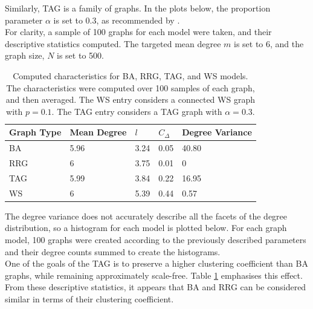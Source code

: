 Similarly, TAG is a family of graphs. In the plots below, the proportion parameter $\alpha$ is set to 0.3, as recommended by \cite{RN49}.\\

For clarity, a sample of 100 graphs for each model were taken, and their descriptive statistics computed. The targeted mean degree $m$ is set to 6, and the graph size, $N$ is set to 500. \\


\FloatBarrier

    

\begin{table}[!h]
\begin{center}
\begin{tabular}{|l|l|l|l|l|}
\hline
Graph Type & Mean Degree & $l$ & $C_\Delta$ & Degree Variance \\ \hline
BA         & 5.96        & 3.24                         & 0.05                   & 40.80           \\ \hline
RRG        & 6           & 3.75                         & 0.01                   & 0               \\ \hline
TAG        & 5.99        & 3.84                         & 0.22                   & 16.95           \\ \hline
WS         & 6           & 5.39                         & 0.44                   & 0.57            \\ \hline
\end{tabular}
\caption{Computed characteristics for BA, RRG, TAG, and WS models. The characteristics were computed over 100 samples of each graph, and then averaged. The WS entry considers a connected WS graph with $p=0.1$. The TAG entry considers a TAG graph with $\alpha = 0.3$. } \label{graph_stats}
\end{center}
\end{table}

\FloatBarrier

The degree variance does not accurately describe all the facets of the degree distribution, so a histogram for each model is plotted below. For each graph model, 100 graphs were created according to the previously described parameters and their degree counts summed to create the histograms. \\
\FloatBarrier
{}
\FloatBarrier
{}
\FloatBarrier
One of the goals of the TAG is to preserve a higher clustering coefficient than BA graphs, while remaining approximately scale-free. Table \ref{graph_stats} emphasises this effect. From these descriptive statistics, it appears that BA and RRG can be considered similar in terms of their clustering coefficient.\\

